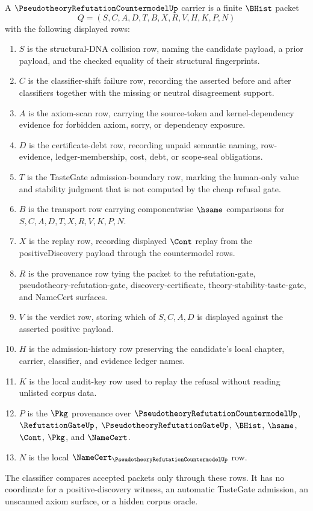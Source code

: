 \begin{definition}
\label{def:pseudotheory-refutation-countermodel-carrier}
A $\PseudotheoryRefutationCountermodelUp$ carrier is a finite $\BHist$ packet
$$
Q=(S,C,A,D,T,B,X,R,V,H,K,P,N)
$$
with the following displayed rows:
\begin{enumerate}
\item $S$ is the structural-DNA collision row, naming the candidate payload, a
prior payload, and the checked equality of their structural fingerprints.
\item $C$ is the classifier-shift failure row, recording the asserted before
and after classifiers together with the missing or neutral disagreement
support.
\item $A$ is the axiom-scan row, carrying the source-token and kernel-dependency
evidence for forbidden axiom, sorry, or dependency exposure.
\item $D$ is the certificate-debt row, recording unpaid semantic naming,
row-evidence, ledger-membership, cost, debt, or scope-seal obligations.
\item $T$ is the TasteGate admission-boundary row, marking the human-only value
and stability judgment that is not computed by the cheap refusal gate.
\item $B$ is the transport row carrying componentwise $\hsame$ comparisons for
$S,C,A,D,T,X,R,V,K,P,N$.
\item $X$ is the replay row, recording displayed $\Cont$ replay from the
positiveDiscovery payload through the countermodel rows.
\item $R$ is the provenance row tying the packet to the refutation-gate,
pseudotheory-refutation-gate, discovery-certificate,
theory-stability-taste-gate, and NameCert surfaces.
\item $V$ is the verdict row, storing which of $S,C,A,D$ is displayed against
the asserted positive payload.
\item $H$ is the admission-history row preserving the candidate's local
chapter, carrier, classifier, and evidence ledger names.
\item $K$ is the local audit-key row used to replay the refusal without reading
unlisted corpus data.
\item $P$ is the $\Pkg$ provenance over
$\PseudotheoryRefutationCountermodelUp$, $\RefutationGateUp$,
$\PseudotheoryRefutationGateUp$, $\BHist$, $\hsame$, $\Cont$, $\Pkg$, and
$\NameCert$.
\item $N$ is the local
$\NameCert_{\PseudotheoryRefutationCountermodelUp}$ row.
\end{enumerate}
The classifier compares accepted packets only through these rows. It has no
coordinate for a positive-discovery witness, an automatic TasteGate admission,
an unscanned axiom surface, or a hidden corpus oracle.
\end{definition}

